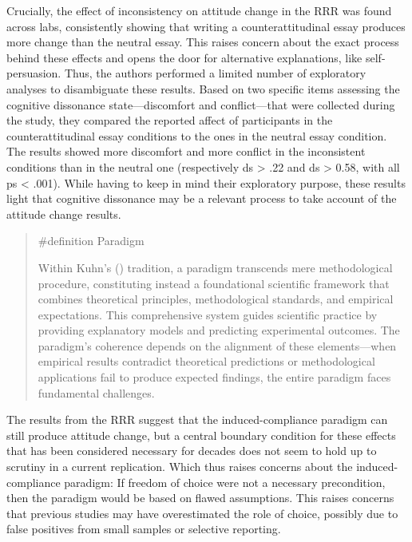 \documentclass[
  letterpaper,
]{book}
\begin{document}
Crucially, the effect of inconsistency on attitude change in the RRR was
found across labs, consistently showing that writing a
counterattitudinal essay produces more change than the neutral essay.
This raises concern about the exact process behind these effects and
opens the door for alternative explanations, like self-persuasion. Thus,
the authors performed a limited number of exploratory analyses to
disambiguate these results. Based on two specific items assessing the
cognitive dissonance state---discomfort and conflict---that were
collected during the study, they compared the reported affect of
participants in the counterattitudinal essay conditions to the ones in
the neutral essay condition. The results showed more discomfort and more
conflict in the inconsistent conditions than in the neutral one
(respectively ds \textgreater{} .22 and ds \textgreater{} 0.58, with all
ps \textless{} .001). While having to keep in mind their exploratory
purpose, these results light that cognitive dissonance may be a relevant
process to take account of the attitude change results.

\begin{quote}
\label{def-paradigm}{\#definition} Paradigm

Within Kuhn's () tradition, a
paradigm transcends mere methodological procedure, constituting instead
a foundational scientific framework that combines theoretical
principles, methodological standards, and empirical expectations. This
comprehensive system guides scientific practice by providing explanatory
models and predicting experimental outcomes. The paradigm's coherence
depends on the alignment of these elements---when empirical results
contradict theoretical predictions or methodological applications fail
to produce expected findings, the entire paradigm faces fundamental
challenges.
\end{quote}

The results from the RRR suggest that the induced-compliance paradigm
can still produce attitude change, but a central boundary condition for
these effects that has been considered necessary for decades does not
seem to hold up to scrutiny in a current replication. Which thus raises
concerns about the induced-compliance paradigm: If freedom of choice
were not a necessary precondition, then the paradigm would be based on
flawed assumptions. This raises concerns that previous studies may have
overestimated the role of choice, possibly due to false positives from
small samples or selective reporting.
\end{document}
